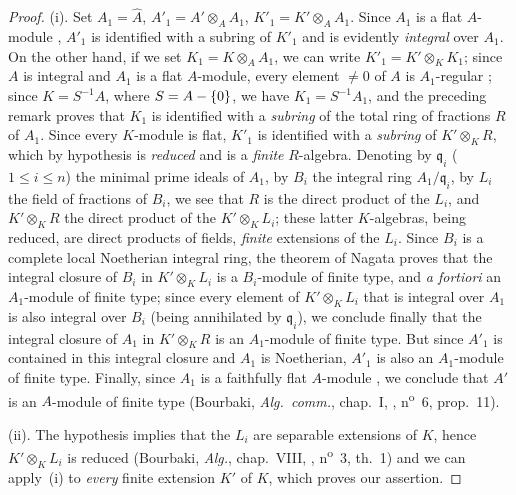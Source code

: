 \begin{proof}
\medskip\noindent
(i).
Set $A_1=\hat{A}$, $A'_1=A'\otimes_A A_1$, $K'_1=K'\otimes_A A_1$.
Since $A_1$ is a flat $A$-module , $A'_1$ is identified with a subring of $K'_1$ and is evidently \emph{integral} over $A_1$.
On the other hand, if we set $K_1=K\otimes_A A_1$, we can write $K'_1=K'\otimes_K K_1$; since $A$ is integral and $A_1$ is a flat $A$-module, every element $\neq 0$ of $A$ is $A_1$-regular ; since $K=S^{-1}A$, where $S=A-\{0\}$, we have $K_1=S^{-1}A_1$, and the preceding remark proves that $K_1$ is identified with a \emph{subring} of the total ring of fractions $R$ of $A_1$.
Since every $K$-module is flat, $K'_1$ is identified with a \emph{subring} of $K'\otimes_K R$, which by hypothesis is \emph{reduced} and is a \emph{finite} $R$-algebra.
Denoting by $\mathfrak{q}_i$ ($1\leq i\leq n$) the minimal prime ideals of $A_1$, by $B_i$ the integral ring $A_1/\mathfrak{q}_i$, by $L_i$ the field of fractions of $B_i$, we see that $R$ is the direct product of the $L_i$, and $K'\otimes_K R$ the direct product of the $K'\otimes_K L_i$; these latter $K$-algebras, being reduced, are direct products of fields, \emph{finite} extensions of the $L_i$.
Since $B_i$ is a complete local Noetherian integral ring, the theorem of Nagata  proves that the integral closure of $B_i$ in $K'\otimes_K L_i$ is a $B_i$-module of finite type, and \emph{a fortiori} an $A_1$-module of finite type; since every element of $K'\otimes_K L_i$ that is integral over $A_1$ is also integral over $B_i$ (being annihilated by $\mathfrak{q}_i$), we conclude finally that the integral closure of $A_1$ in $K'\otimes_K R$ is an $A_1$-module of finite type.
But since $A'_1$ is contained in this integral closure and $A_1$ is Noetherian, $A'_1$ is also an $A_1$-module of finite type.
Finally, since $A_1$ is a faithfully flat $A$-module , we conclude that $A'$ is an $A$-module of finite type (Bourbaki, \emph{Alg.~comm.}, chap.~I, , n\textsuperscript{o}~6, prop.~11).

\medskip\noindent
{}
(ii).
The hypothesis implies that the $L_i$ are separable extensions of $K$, hence $K'\otimes_K L_i$ is reduced (Bourbaki, \emph{Alg.}, chap.~VIII, , n\textsuperscript{o}~3, th.~1) and we can apply~(i) to \emph{every} finite extension $K'$ of $K$, which proves our assertion.
\end{proof}

